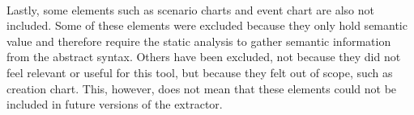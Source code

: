 \paragraph{}
Lastly, some elements such as scenario charts and event chart are also not included. Some of these elements were excluded because they only hold semantic value and therefore require the static analysis to gather semantic information from the abstract syntax. Others have been excluded, not because they did not feel relevant or useful for this tool, but because they felt out of scope, such as creation chart. This, however, does not mean that these elements could not be included in future versions of the extractor.
